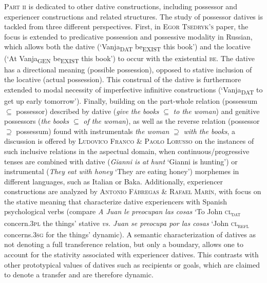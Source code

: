 \documentclass[output=paper,modfonts,nonflat,colorlinks,citecolor=brown]{langsci/langscibook}
\begin{document}
{\textsc{Part ii} is dedicated to} other{ dative constructions, including possessor and experiencer constructions and related structures. The study of possessor datives is tackled from three different perspectives. First, in \textsc{Egor Tsedryk’s} paper,} the focus is extended to predicative possession and possessive modality in Russian, which allows both the dative (‘Vanja\textsc{\textsubscript{DAT}} be\textsc{\textsubscript{EXIST}} this book’) and the locative (‘At Vanja\textsubscript{GEN} be\textsubscript{EXIST} this book’) to occur with the existential \textsc{be}. The dative has a directional meaning (possible possession), opposed to stative inclusion of the locative (actual possession). This construal of the dative is furthermore extended to modal necessity of imperfective infinitive constructions (‘Vanja\textsubscript{DAT} to get up early tomorrow’).  Finally, building on the part-whole relation (possessum {${\subseteq}$} possessor) described by dative ({\textit{give the books} ${\subseteq}$ \textit{to the woman}}) and genitive possessors ({\textit{the books} ${\subseteq}$ \textit{of the woman}}), as well as the reverse relation (possessor {${\supseteq}$} possessum) found with instrumentals {\textit{the woman} ${\supseteq}$ \textit{with the books}}, a discussion is offered by \textsc{Ludovico Franco \& Paolo Lorusso} on the instances of such inclusive relations in the aspectual domain, when continuous/progressive tenses are combined with dative ({\textit{Gianni is at hunt}} ‘Gianni is hunting’) or instrumental ({\textit{They eat with honey}} ‘They are eating honey’) morphemes in different languages, such as Italian or Baka. Additionally, experiencer{ constructions are analyzed by \textsc{Antonio Fábregas \& Rafael Marín}, with focus on the stative meaning that characterize dative experiencers with Spanish psychological verbs (compare \textit{A Juan le preocupan las cosas} ‘To John \textsc{cl\textsubscript{dat}} concern.\textsc{3pl} the things’ stative \textit{vs. Juan se preocupa por las cosas} ‘John \textsc{cl\textsubscript{refl}} concerns.\textsc{3sg} for the things’ dynamic). A semantic characterization of datives as not denoting a full transference relation, but only a boundary, allows one to account for the stativity associated with experiencer datives. This contrasts with other prototypical values of datives such as recipients or goals, which are claimed to denote a transfer and are therefore dynamic}.
\end{document}
